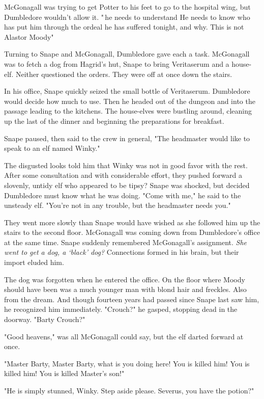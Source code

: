 McGonagall was trying to get Potter to his feet to go to the hospital wing, but Dumbledore wouldn't allow it. "{\el}\,he needs to understand{\el} He needs to know who has put him through the ordeal he has suffered tonight, and why. This is not Alastor Moody{\el}"

Turning to Snape and McGonagall, Dumbledore gave each a task. McGonagall was to fetch a dog from Hagrid's hut, Snape to bring Veritaserum and a house-elf. Neither questioned the orders. They were off at once down the stairs.

In his office, Snape quickly seized the small bottle of Veritaserum. Dumbledore would decide how much to use. Then he headed out of the dungeon and into the passage leading to the kitchens. The house-elves were bustling around, cleaning up the last of the dinner and beginning the preparations for breakfast.

Snape paused, then said to the crew in general, "The headmaster would like to speak to an elf named Winky."

The disgusted looks told him that Winky was not in good favor with the rest. After some consultation and with considerable effort, they pushed forward a slovenly, untidy elf who appeared to be{\el} tipsy? Snape was shocked, but decided Dumbledore must know what he was doing. "Come with me," he said to the unsteady elf. "You're not in any trouble, but the headmaster needs you."

They went more slowly than Snape would have wished as she followed him up the stairs to the second floor. McGonagall was coming down from Dumbledore's office at the same time. Snape suddenly remembered McGonagall's assignment. \emph{She went to get a dog, a `black' dog?} Connections formed in his brain, but their import eluded him.

The dog was forgotten when he entered the office. On the floor where Moody should have been was a much younger man with blond hair and freckles. Also from the dream. And though fourteen years had passed since Snape last saw him, he recognized him immediately. "Crouch?" he gasped, stopping dead in the doorway. "Barty Crouch?"

"Good heavens," was all McGonagall could say, but the elf darted forward at once.

"Master Barty, Master Barty, what is you doing here! You is killed him! You is killed him! You is killed Master's son!"

"He is simply stunned, Winky. Step aside please. Severus, you have the potion?"

